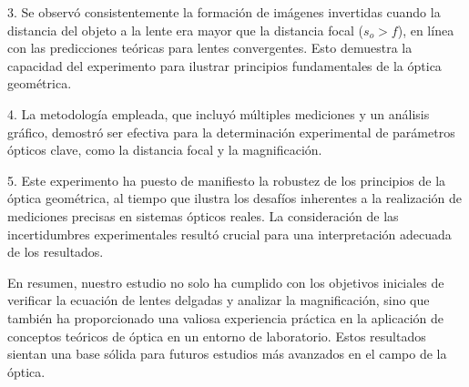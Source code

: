 \documentclass[twocolumn,a4paper,11pt]{scrartcl}
\begin{document}
3. Se observó consistentemente la formación de imágenes invertidas cuando la distancia del objeto a la lente era mayor que la distancia focal ($s_o > f$), en línea con las predicciones teóricas para lentes convergentes. Esto demuestra la capacidad del experimento para ilustrar principios fundamentales de la óptica geométrica.

4. La metodología empleada, que incluyó múltiples mediciones y un análisis gráfico, demostró ser efectiva para la determinación experimental de parámetros ópticos clave, como la distancia focal y la magnificación.

5. Este experimento ha puesto de manifiesto la robustez de los principios de la óptica geométrica, al tiempo que ilustra los desafíos inherentes a la realización de mediciones precisas en sistemas ópticos reales. La consideración de las incertidumbres experimentales resultó crucial para una interpretación adecuada de los resultados.

En resumen, nuestro estudio no solo ha cumplido con los objetivos iniciales de verificar la ecuación de lentes delgadas y analizar la magnificación, sino que también ha proporcionado una valiosa experiencia práctica en la aplicación de conceptos teóricos de óptica en un entorno de laboratorio. Estos resultados sientan una base sólida para futuros estudios más avanzados en el campo de la óptica.



\end{document}
